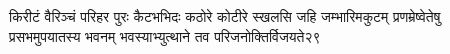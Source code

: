 \fourlineindentedshlokanum
{किरीटं वैरिञ्चं परिहर पुरः कैटभभिदः}
{कठोरे कोटीरे स्खलसि जहि जम्भारिमकुटम्}
{प्रणम्रेष्वेतेषु प्रसभमुपयातस्य भवनम्}
{भवस्याभ्युत्थाने तव परिजनोक्तिर्विजयते}{२९}

%
%
%
%
%
%
%
%
%
%
%
%
%
%

